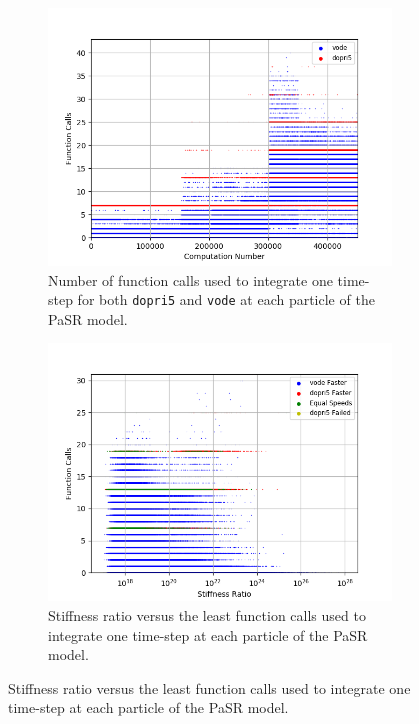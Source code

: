 \documentclass[12pt]{ussci}
\begin{document}
\begin{figure}[htbp]
   \centering
   \begin{subfigure}{0.43\textwidth}
       \includegraphics[width=\linewidth]{GRI_Mech_3/PaSR_Fn_Work_1e-09.png}
       \caption{Number of function calls used to integrate one time-step for both \texttt{dopri5} and \texttt{vode} at each particle of the PaSR model.}
       \label{fig:FWGRIPaSR}
   \end{subfigure}
   \hfill
   \begin{subfigure}{0.43\textwidth}
       \includegraphics[width=\linewidth]{GRI_Mech_3/PaSR_Fn_Work_Ratio_Groupings_1e-09.png}
       \caption{Stiffness ratio versus the least function calls used to integrate one time-step at each particle of the PaSR model.}

\end{subfigure}
\end{figure}
\end{document}
